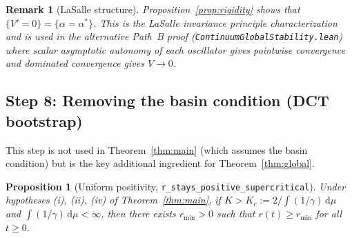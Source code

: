 \documentclass[11pt,a4paper]{article}
\newtheorem{proposition}[theorem]{Proposition}
\newtheorem{remark}[theorem]{Remark}
\theoremstyle{definition}
\begin{document}
\begin{remark}[LaSalle structure]
Proposition~\ref{prop:rigidity} shows that $\{V' = 0\} = \{\alpha = \alpha^*\}$. This is the LaSalle invariance principle characterization and is used in the alternative Path~B proof (\texttt{ContinuumGlobalStability.lean}) where scalar asymptotic autonomy of each oscillator gives pointwise convergence and dominated convergence gives $V \to 0$.
\end{remark}

\subsection{Step 8: Removing the basin condition (DCT bootstrap)}\label{sec:bootstrap}

This step is not used in Theorem~\ref{thm:main} (which assumes the basin condition) but is the key additional ingredient for Theorem~\ref{thm:global}.

\begin{proposition}[Uniform positivity, \texttt{r\_stays\_positive\_supercritical}]\label{prop:rpos}
Under hypotheses (i), (ii), (iv) of Theorem~\ref{thm:main}, if $K > K_c := 2/\int(1/\gamma)\,\mathrm{d}\mu$ and $\int(1/\gamma)\,\mathrm{d}\mu < \infty$, then there exists $r_{\min} > 0$ such that $r(t) \geq r_{\min}$ for all $t \geq 0$.
\end{proposition}
\end{document}
